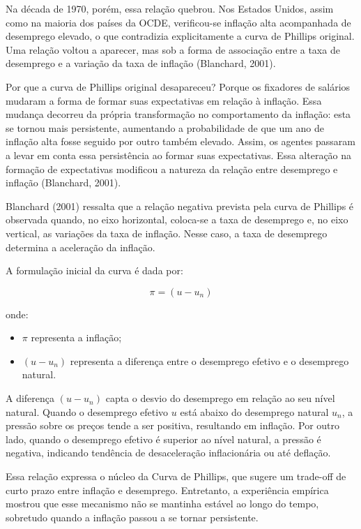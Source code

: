 \documentclass[12pt,oneside]{abntex2}
\begin{document}
Na década de 1970, porém, essa relação quebrou. Nos Estados Unidos, assim como na maioria dos países da OCDE, verificou-se inflação alta acompanhada de desemprego elevado, o que contradizia explicitamente a curva de Phillips original. Uma relação voltou a aparecer, mas sob a forma de associação entre a taxa de desemprego e a variação da taxa de inflação (Blanchard, 2001).  

Por que a curva de Phillips original desapareceu? Porque os fixadores de salários mudaram a forma de formar suas expectativas em relação à inflação. Essa mudança decorreu da própria transformação no comportamento da inflação: esta se tornou mais persistente, aumentando a probabilidade de que um ano de inflação alta fosse seguido por outro também elevado. Assim, os agentes passaram a levar em conta essa persistência ao formar suas expectativas. Essa alteração na formação de expectativas modificou a natureza da relação entre desemprego e inflação (Blanchard, 2001).  

Blanchard (2001) ressalta que a relação negativa prevista pela curva de Phillips é observada quando, no eixo horizontal, coloca-se a taxa de desemprego e, no eixo vertical, as variações da taxa de inflação. Nesse caso, a taxa de desemprego determina a aceleração da inflação.  

A formulação inicial da curva é dada por:

\[
\pi = (u - u_n)
\]

onde:
\begin{itemize}
    \item $\pi$ representa a inflação;
    \item $(u - u_n)$ representa a diferença entre o desemprego efetivo e o desemprego natural.
\end{itemize}

A diferença $(u - u_n)$ capta o desvio do desemprego em relação ao seu nível natural. Quando o desemprego efetivo $u$ está abaixo do desemprego natural $u_n$, a pressão sobre os preços tende a ser positiva, resultando em inflação. Por outro lado, quando o desemprego efetivo é superior ao nível natural, a pressão é negativa, indicando tendência de desaceleração inflacionária ou até deflação.  

Essa relação expressa o núcleo da Curva de Phillips, que sugere um trade-off de curto prazo entre inflação e desemprego. Entretanto, a experiência empírica mostrou que esse mecanismo não se mantinha estável ao longo do tempo, sobretudo quando a inflação passou a se tornar persistente.  
\end{document}
